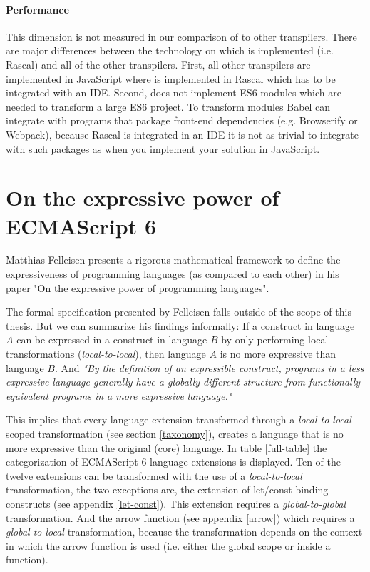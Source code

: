 \paragraph{Performance}
This dimension is not measured in our comparison of \projectname to other transpilers. There are major differences between the technology on which \projectname is implemented (i.e. Rascal) and all of the other transpilers. First, all other transpilers are implemented in JavaScript where \projectname is implemented in Rascal which has to be integrated with an IDE. Second, \projectname does not implement ES6 modules which are needed to transform a large ES6 project. To transform modules Babel can integrate with programs that package front-end dependencies (e.g. Browserify or Webpack), because Rascal is integrated in an IDE it is not as trivial to integrate with such packages as when you implement your solution in JavaScript. 

\section{On the expressive power of ECMAScript 6}
Matthias Felleisen presents a rigorous mathematical framework to define the expressiveness of programming languages (as compared to each other) in his paper "On the expressive power of programming languages"\cite{Felleisen1990}.

The formal specification presented by Felleisen falls outside of the scope of this thesis. But we can summarize his findings informally: If a construct in language $A$ can be expressed in a construct in language $B$ by only performing local transformations (\textit{local-to-local}), then language $A$ is no more expressive than language $B$. And \textit{"By the definition of an expressible construct, programs in a less expressive language generally have a globally different structure from functionally equivalent programs in a more expressive language."}\cite{Felleisen1990}

This implies that every language extension transformed through a \textit{local-to-local} scoped transformation (see section \ref{taxonomy}), creates a language that is no more expressive than the original (core) language. In table \ref{full-table} the categorization of ECMAScript 6 language extensions is displayed. Ten of the twelve extensions can be transformed with the use of a \textit{local-to-local} transformation, the two exceptions are, the extension of let/const binding constructs (see appendix \ref{let-const}). This extension requires a \textit{global-to-global} transformation. And the arrow function (see appendix \ref{arrow}) which requires a \textit{global-to-local} transformation, because the transformation depends on the context in which the arrow function is used (i.e. either the global scope or inside a function).

